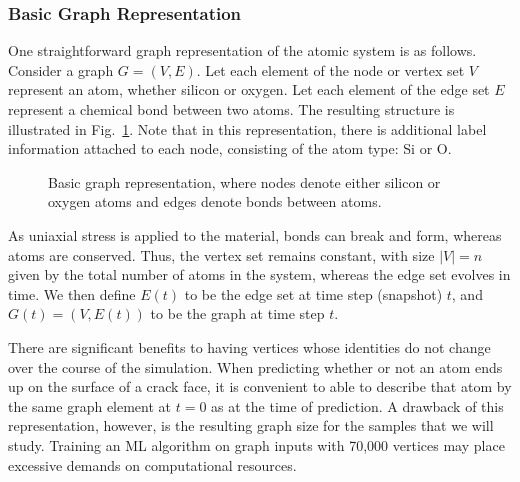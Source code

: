 \subsubsection{Basic Graph Representation}

One straightforward graph representation of the atomic system is as follows.  Consider a graph $G =(V,E)$.  Let each element of the node or vertex set $V$ represent an atom, whether silicon or oxygen.  Let each element of the edge set $E$ represent a chemical bond between two atoms.  The resulting structure is illustrated in Fig.~\ref{fig:basic_graph}.  Note that in this representation, there is additional label information attached to each node, consisting of the atom type: Si or O.

\begin{figure}
\centering
\noindent
\caption{Basic graph representation, where nodes denote either silicon or oxygen atoms and edges denote bonds between atoms.}
\label{fig:basic_graph}
\end{figure}

As uniaxial stress is applied to the material, bonds can break and form, whereas atoms are conserved.  Thus, the vertex set remains constant, with size $|V|=n$ given by the total number of atoms in the system, whereas the edge set evolves in time.  We then define $E(t)$ to be the edge set at time step (snapshot) $t$, and $G(t) = (V,E(t))$ to be the graph at time step $t$.

There are significant benefits to having vertices whose identities do not change over the course of the simulation.  When predicting whether or not an atom ends up on the surface of a crack face, it is convenient to able to describe that atom by the same graph element at $t=0$ as at the time of prediction.  A drawback of this representation, however, is the resulting graph size for the samples that we will study.  Training an ML algorithm on graph inputs with 70,000 vertices may place excessive demands on computational resources.
    
